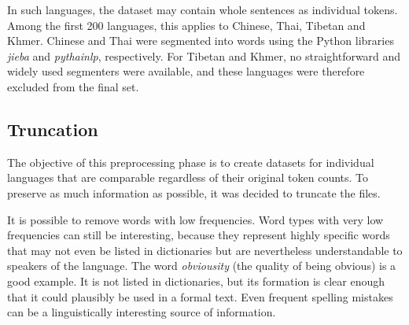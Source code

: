 In such languages, the dataset may contain whole sentences as individual tokens. Among the first 200 languages, this applies to Chinese, Thai, Tibetan and Khmer. Chinese and Thai were segmented into words using the Python libraries \textit{jieba} and \textit{pythainlp}, respectively. For Tibetan and Khmer, no straightforward and widely used segmenters were available, and these languages were therefore excluded from the final set.

\newpage
\subsection{Truncation}
\label{sec:truncation}
The objective of this preprocessing phase is to create datasets for individual languages that are comparable regardless of their original token counts. To preserve as much information as possible, it was decided to truncate the files.

It is possible to remove words with low frequencies. Word types with very low frequencies can still be interesting, because they represent highly specific words that may not even be listed in dictionaries but are nevertheless understandable to speakers of the language. The word \textit{obviousity} (the quality of being obvious) is a good example. It is not listed in dictionaries, but its formation is clear enough that it could plausibly be used in a formal text. Even frequent spelling mistakes can be a linguistically interesting source of information.

